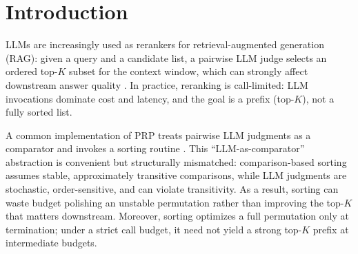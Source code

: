 \documentclass[11pt]{article}
\begin{document}
\begin{abstract} Pairwise Ranking Prompting (PRP) elicits pairwise preference judgments from LLMs, which are typically aggregated using classical sorting algorithms. This is mismatched to practice: LLM preferences are noisy, order-sensitive, and can be intransitive, while deployments care about top $K$ quality under a call budget. We reframe reranking as active learning from noisy pairwise comparisons and benchmark active rankers as drop-in replacements for PRP sorting algorithms, improving NDCG@10 per call in the call-constrained regime. Additionally, leveraging this noise-robust framework, we introduce a randomized-direction oracle that uses a single LLM call per pair by randomizing the prompt order, ensuring order consistency despite inherent call bias. \end{abstract}




\section{Introduction}
LLMs are increasingly used as rerankers for retrieval-augmented generation (RAG): given a query and a candidate list,
a pairwise LLM judge selects an ordered top-$K$ subset for the context window, which can strongly affect downstream answer quality
\citep{zhu2023llmir,dong2024grag,sun2025dynamicrag}.
In practice, reranking is call-limited: LLM invocations dominate cost and latency, and the goal is a prefix (top-$K$), not a fully sorted list.

A common implementation of PRP treats pairwise LLM judgments as a comparator and invokes a sorting routine
\citep{qin2024pairwise,sun2023chatgptsearch}.
This ``LLM-as-comparator'' abstraction is convenient but structurally mismatched:
comparison-based sorting assumes stable, approximately transitive comparisons, while LLM judgments are stochastic, order-sensitive, and can violate transitivity.
As a result, sorting can waste budget polishing an unstable permutation rather than improving the top-$K$ that matters downstream.
Moreover, sorting optimizes a full permutation only at termination; under a strict call budget, it need not yield a strong top-$K$ prefix at intermediate budgets.
\end{document}
